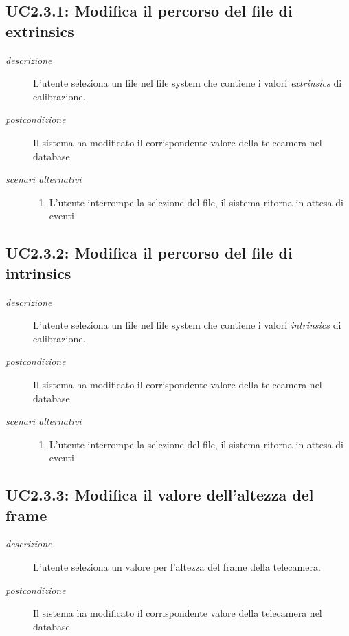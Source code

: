 \subsection{UC2.3.1: Modifica il percorso del file di extrinsics} \label{sec:UC2.3.1}
\begin{description}
\item[\em{descrizione }]L'utente seleziona un file nel file system che contiene i valori \textit{extrinsics} di calibrazione.
\item[\em{postcondizione }] Il sistema ha modificato il corrispondente valore della telecamera nel database
\item[\em{scenari alternativi }] \mbox{} 
\begin{enumerate} 
\item L'utente interrompe la selezione del file, il sistema ritorna in attesa di eventi
\end{enumerate}
\end{description}

\subsection{UC2.3.2: Modifica il percorso del file di intrinsics} \label{sec:UC2.3.2}
\begin{description}
\item[\em{descrizione }]L'utente seleziona un file nel file system che contiene i valori \textit{intrinsics} di calibrazione.
\item[\em{postcondizione }] Il sistema ha modificato il corrispondente valore della telecamera nel database
\item[\em{scenari alternativi }] \mbox{} 
\begin{enumerate} 
\item L'utente interrompe la selezione del file, il sistema ritorna in attesa di eventi
\end{enumerate}
\end{description}

\subsection{UC2.3.3: Modifica il valore dell'altezza del frame} \label{sec:UC2.3.3}
\begin{description}
\item[\em{descrizione }]L'utente seleziona un valore per l'altezza del frame della telecamera.
\item[\em{postcondizione }] Il sistema ha modificato il corrispondente valore della telecamera nel database
\end{description}

